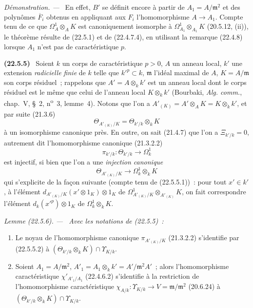 \documentclass[10pt,oneside]{book}
\makeatletter
\newcommand{\setmanualcurrentlabel}[1]{\def\@currentlabel{#1}}
\newcommand{\oldpage}[2][]{%
  \setcounter{footnote}{0}%
  \marginpar{\scriptsize\textbf{#1}~|~#2}\ignorespaces}
\newenvironment{env}[1][]{\setmanualcurrentlabel{#1}\par\medskip\noindent\textbf{(#1)}\ }{\par}
\newenvironment{lemma}[1][]{%
  \setmanualcurrentlabel{#1}\par\medskip\noindent\itshape Lemme (#1). ---\ }{\par}
\newenvironment{proof}{%
  \par\medskip\noindent\textit{Démonstration. ---\ }}{\par}
\makeatother
\begin{document}
\begin{proof}
En effet, $B'$ se définit encore à partir de $A_1=A/\mathfrak m^2$ et des
polynômes $\overline F_i$ obtenus en appliquant aux $F_i$ l'homomorphisme
$A\longrightarrow A_1$. Compte tenu de ce que $\Omega^1_A\otimes_AK$ est
canoniquement isomorphe à $\Omega^1_{A_1}\otimes_{A_1}K$ (20.5.12, (ii)), le
théorème résulte de (22.5.1) et de (22.4.7.4), en utilisant la remarque
(22.4.8) lorsque $A_1$ n'est pas de caractéristique $p$.
\end{proof}

\oldpage[0\textsubscript{IV-1}]{203}

\begin{env}[22.5.5]
\label{0.22.5.5-fr}
Soient $k$ un corps de caractéristique $p>0$, $A$ un anneau local, $k'$ une
extension \emph{radicielle finie} de $k$ telle que $k'^p\subset k$,
$\mathfrak m$ l'idéal maximal de $A$, $K=A/\mathfrak m$ son corps résiduel~;
rappelons que $A'=A\otimes_kk'$ est un anneau local dont le corps résiduel est
le même que celui de l'anneau local $K\otimes_kk'$ (Bourbaki,
\emph{Alg. comm.}, chap.~V, §~2, n\textsuperscript{o}~3, lemme~4). Notons que
l'on a $A'_{(K)}=A'\otimes_AK=K\otimes_kk'$, et par suite (21.3.6)
\begin{equation}
\label{0.22.5.5.1-fr}
  \Theta_{A'_{(K)}/K}=\Theta_{k'/k}\otimes_kK
  \tag{22.5.5.1}
\end{equation}
à un isomorphisme canonique près. En outre, on sait (21.4.7) que l'on a
$\Xi_{k'/k}=0$, autrement dit l'homomorphisme canonique (21.3.2.2)
\[
  \pi_{k'/k}:\Theta_{k'/k}\longrightarrow\Omega^1_k
\]
est injectif, si bien que l'on a une \emph{injection canonique}
\begin{equation}
\label{0.22.5.5.2-fr}
  \Theta_{A'_{(K)}/K}\longrightarrow\Omega^1_k\otimes_kK
  \tag{22.5.5.2}
\end{equation}
qui s'explicite de la façon suivante (compte tenu de (22.5.5.1))~: pour tout
$x'\in k'$, à l'élément
$d_{A'_{(K)}/K}(x'\otimes1_K)\otimes1_K$ de
$\Omega^1_{A'_{(K)}/K}\otimes_{A'_{(K)}}K$, on fait correspondre l'élément
$d_k(x'^p)\otimes1_K$ de $\Omega^1_k\otimes_kK$.
\end{env}

\begin{lemma}[22.5.6]
\label{0.22.5.6-fr}
Avec les notations de (22.5.5)~:
\begin{enumerate}
  \item[\rm(i)] Le noyau de l'homomorphisme canonique
  $\pi_{A'_{(K)}/K}$ (21.3.2.2) s'identifie par (22.5.5.2) à
  $(\Theta_{k'/k}\otimes_kK)\cap\Upsilon_{K/k}$.
  \item[\rm(ii)] Soient $A_1=A/\mathfrak m^2$,
  $A'_1=A_1\otimes_kk'=A'/\mathfrak m^2A'$~; alors l'homomorphisme
  caractéristique $\chi'_{A'_1/A_1}$ (22.4.6.2) s'identifie à la restriction de
  l'homomorphisme caractéristique
  $\chi_{A/k}:\Upsilon_{K/k}\longrightarrow V=\mathfrak m/\mathfrak m^2$
  (20.6.24) à $(\Theta_{k'/k}\otimes_kK)\cap\Upsilon_{K/k}$.
\end{enumerate}
\end{lemma}
\end{document}
